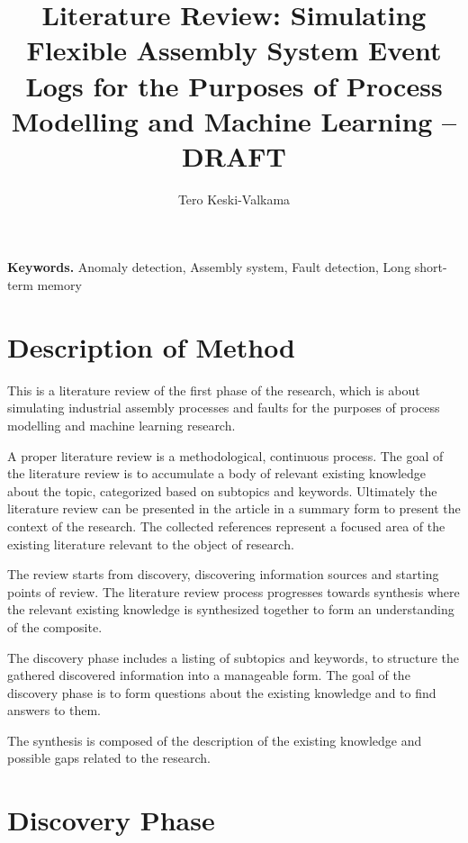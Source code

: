\documentclass[a4paper,10pt]{article}
\title{Literature Review: Simulating Flexible Assembly System Event Logs for the Purposes of Process Modelling and Machine Learning – DRAFT}
\author{Tero Keski-Valkama}
\begin{document}
\maketitle

\smallskip
\noindent \textbf{Keywords.} Anomaly detection, Assembly system, Fault detection, Long short-term memory

\section{Description of Method}

This is a literature review of the first phase of the research, which is about simulating industrial assembly processes and faults for the purposes of
process modelling and machine learning research.

A proper literature review is a methodological, continuous process. The goal of the literature review is to accumulate a body of relevant existing knowledge
about the topic, categorized based on subtopics and keywords.
Ultimately the literature review can be presented in the article in a summary form to present the context of the research.
The collected references represent a focused area of the existing literature relevant to the object of research.

The review starts from discovery, discovering information sources and starting points of review. The literature review process progresses towards synthesis
where the relevant existing knowledge is synthesized together to form an understanding of the composite.

The discovery phase includes a listing of subtopics and keywords, to structure the gathered discovered information into a manageable form. The goal
of the discovery phase is to form questions about the existing knowledge and to find answers to them.

The synthesis is composed of the description of the existing knowledge and possible gaps related to the research.

\section{Discovery Phase}
\end{document}
